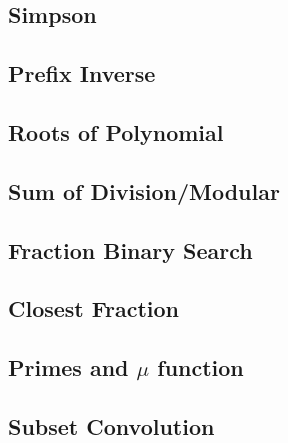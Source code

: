 \documentclass[a4paper,10pt,twocolumn,oneside]{article}
\begin{document}
\subsection{Simpson}


%

\subsection{Prefix Inverse}


\subsection{Roots of Polynomial}


%

\subsection{Sum of Division/Modular}


\subsection{Fraction Binary Search}


\subsection{Closest Fraction}


\subsection{Primes and $\mu$ function}


\subsection{Subset Convolution}

\end{document}

